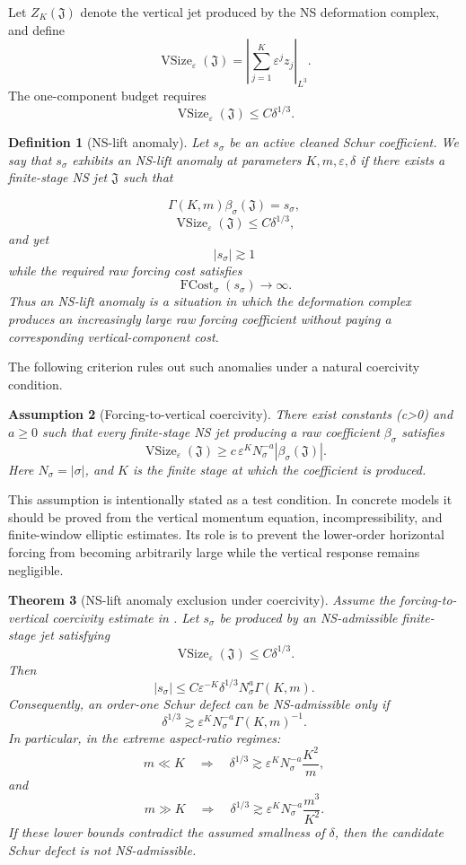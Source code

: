 \documentclass[11pt]{article}
\numberwithin{equation}{section}
\newtheorem{theorem}{Theorem}[section]
\newtheorem{definition}[theorem]{Definition}
\newtheorem{assumption}[theorem]{Assumption}
\begin{document}
Let \(Z_K(\mathfrak J)\) denote the vertical jet produced by the NS deformation complex, and define
\[
\operatorname{VSize}_\varepsilon(\mathfrak J) =
\left|
\sum_{j=1}^K\varepsilon^j z_j
\right|_{L^3}.
\]
The one-component budget requires
\[
\operatorname{VSize}_\varepsilon(\mathfrak J)
\le
C\delta^{1/3}.
\]

\begin{definition}[NS-lift anomaly]
Let \(s_\sigma\) be an active cleaned Schur coefficient. We say that \(s_\sigma\) exhibits an NS-lift anomaly at parameters \(K,m,\varepsilon,\delta\) if there exists a finite-stage NS jet \(\mathfrak J\) such that

\[
\Gamma(K,m)\beta_\sigma(\mathfrak J)=s_\sigma,
\]
\[
\operatorname{VSize}_\varepsilon(\mathfrak J)
\le
C\delta^{1/3},
\]
and yet
\[
|s_\sigma|\gtrsim1
\]
while the required raw forcing cost satisfies
\[
\operatorname{FCost}_{\sigma}(s_\sigma)\to\infty.
\]
Thus an NS-lift anomaly is a situation in which the deformation complex produces an increasingly large raw forcing coefficient without paying a corresponding vertical-component cost.
\end{definition}

The following criterion rules out such anomalies under a natural coercivity condition.

\begin{assumption}[Forcing-to-vertical coercivity]\label{ass:forcing-to-vertical-coercivity}
There exist constants (c>0) and \(a\ge0\) such that every finite-stage NS jet producing a raw coefficient \(\beta_\sigma\) satisfies
\[
\operatorname{VSize}_\varepsilon(\mathfrak J)
\ge
c\,\varepsilon^K
N_\sigma^{-a}
|\beta_\sigma(\mathfrak J)|.
\]
Here \(N_\sigma=|\sigma|\), and \(K\) is the finite stage at which the coefficient is produced.
\end{assumption}

This assumption is intentionally stated as a test condition. In concrete models it should be proved from the vertical momentum equation, incompressibility, and finite-window elliptic estimates. Its role is to prevent the lower-order horizontal forcing from becoming arbitrarily large while the vertical response remains negligible.

\begin{theorem}[NS-lift anomaly exclusion under coercivity]
Assume the forcing-to-vertical coercivity estimate in . Let \(s_\sigma\) be produced by an NS-admissible finite-stage jet satisfying
\[
\operatorname{VSize}_\varepsilon(\mathfrak J)
\le
C\delta^{1/3}.
\]
Then
\[
|s_\sigma|
\le
C
\varepsilon^{-K}
\delta^{1/3}
N_\sigma^a
\Gamma(K,m).
\]
Consequently, an order-one Schur defect can be NS-admissible only if
\[
\delta^{1/3}
\gtrsim
\varepsilon^K
N_\sigma^{-a}
\Gamma(K,m)^{-1}.
\]
In particular, in the extreme aspect-ratio regimes:
\[
m\ll K
\quad\Longrightarrow\quad
\delta^{1/3}
\gtrsim
\varepsilon^K
N_\sigma^{-a}
\frac{K^2}{m},
\]
and
\[
m\gg K
\quad\Longrightarrow\quad
\delta^{1/3}
\gtrsim
\varepsilon^K
N_\sigma^{-a}
\frac{m^3}{K^2}.
\]
If these lower bounds contradict the assumed smallness of \(\delta\), then the candidate Schur defect is not NS-admissible.
\end{theorem}
\end{document}
